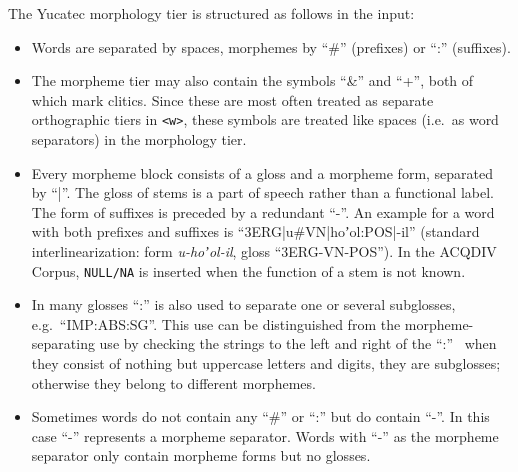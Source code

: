 \documentclass[a4paper, 11pt]{book}
\begin{document}
\noindent The Yucatec morphology tier is structured as follows in the input: 

\begin{itemize}
	\item Words are separated by spaces, morphemes by “\#” (prefixes) or “:” (suffixes). 
	\item The morpheme tier may also contain the symbols “\&” and “+”, both of which mark clitics. Since these are most often treated as 
		separate orthographic tiers in \texttt{<w>}, these symbols are treated like spaces (i.e.\ as word separators) in the
		morphology tier. 
	\item Every morpheme block consists of a gloss and a morpheme form, separated by “|”. The gloss of stems is a part of speech rather than a 
		functional label. The form of suffixes is preceded by a redundant “-”. An example for a word with both prefixes and suffixes is 
		“3ERG|u\#VN|hoʼol:POS|-il” (standard interlinearization: form \emph{u-hoʼol-il}, gloss “3ERG-VN-POS”). In the ACQDIV Corpus, \texttt{NULL/NA}
		is inserted when the function of a stem is not known. 
	\item In many glosses “:” is also used to separate one or several subglosses, e.g.\ “IMP:ABS:SG”. This use can be distinguished 
		from the morpheme-separating use by checking the strings to the left and right of the “:” \textendash\ when they consist 
		of nothing but uppercase letters and digits, they are subglosses; otherwise they belong to different morphemes.
	\item Sometimes words do not contain any “\#” or “:” but do contain “-”. In this case “-” represents a morpheme separator. 
		Words with “-” as the morpheme separator only contain morpheme forms but no glosses. 
\end{itemize}

\end{document}
